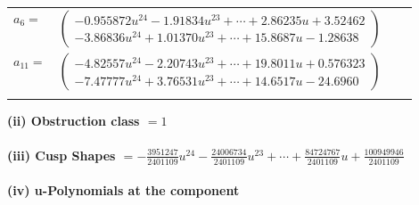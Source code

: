 \documentclass[1p]{elsarticle_modified}
\theoremstyle{definition}
\begin{document}
\begin{tabular}{m{7pt} m{180pt} m{7pt} m{180pt} }
\flushright $a_{6}=$&$\begin{pmatrix}-0.955872 u^{24}-1.91834 u^{23}+\cdots+2.86235 u+3.52462\\-3.86836 u^{24}+1.01370 u^{23}+\cdots+15.8687 u-1.28638\end{pmatrix}$ \\
\flushright $a_{11}=$&$\begin{pmatrix}-4.82557 u^{24}-2.20743 u^{23}+\cdots+19.8011 u+0.576323\\-7.47777 u^{24}+3.76531 u^{23}+\cdots+14.6517 u-24.6960\end{pmatrix}$\\&\end{tabular}
\flushleft \textbf{(ii) Obstruction class $= 1$}\\~\\
\flushleft \textbf{(iii) Cusp Shapes $= -\frac{3951247}{2401109} u^{24}-\frac{24006734}{2401109} u^{23}+\cdots+\frac{84724767}{2401109} u+\frac{100949946}{2401109}$}\\~\\
\newpage\renewcommand{\arraystretch}{1}
\flushleft \textbf{(iv) u-Polynomials at the component}\newline \\
\end{document}
